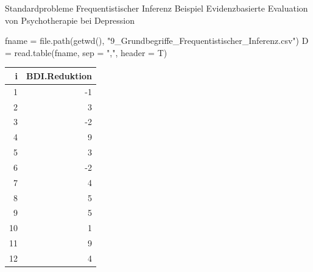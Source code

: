 \documentclass[
  8pt,
  ignorenonframetext,
]{beamer}
\newenvironment{Shaded}{\begin{snugshade}}{\end{snugshade}}
\newcommand{\AttributeTok}[1]{\textcolor[rgb]{0.77,0.63,0.00}{#1}}
\newcommand{\FunctionTok}[1]{\textcolor[rgb]{0.00,0.00,0.00}{#1}}
\newcommand{\NormalTok}[1]{#1}
\newcommand{\OtherTok}[1]{\textcolor[rgb]{0.56,0.35,0.01}{#1}}
\newcommand{\StringTok}[1]{\textcolor[rgb]{0.31,0.60,0.02}{#1}}
\begin{document}
\begin{frame}[fragile,t]{Standardprobleme Frequentistischer Inferenz}
\protect\hypertarget{standardprobleme-frequentistischer-inferenz-4}{}
Beispiel \textbar{} Evidenzbasierte Evaluation von Psychotherapie bei
Depression

\small
\vspace{2mm}

\footnotesize

\begin{Shaded}
\begin{Highlighting}[]
\NormalTok{fname }\OtherTok{=} \FunctionTok{file.path}\NormalTok{(}\FunctionTok{getwd}\NormalTok{(), }\StringTok{"9\_Grundbegriffe\_Frequentistischer\_Inferenz.csv"}\NormalTok{)}
\NormalTok{D     }\OtherTok{=} \FunctionTok{read.table}\NormalTok{(fname, }\AttributeTok{sep =} \StringTok{","}\NormalTok{, }\AttributeTok{header =}\NormalTok{ T)}
\end{Highlighting}
\end{Shaded}

\vspace{2mm}

\begin{longtable}[]{@{}rr@{}}
\toprule()
i & BDI.Reduktion \\
\midrule()
\endhead
1 & -1 \\
2 & 3 \\
3 & -2 \\
4 & 9 \\
5 & 3 \\
6 & -2 \\
7 & 4 \\
8 & 5 \\
9 & 5 \\
10 & 1 \\
11 & 9 \\
12 & 4 \\
\bottomrule()
\end{longtable}
\end{frame}
\end{document}
